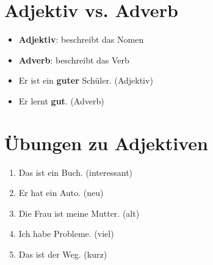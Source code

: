 \section{Adjektiv vs. Adverb}
\label{sec:AdjvsAdv}

\begin{tcolorbox}[title=Unterscheidung]
\begin{itemize}
    \item \textbf{Adjektiv}: beschreibt das Nomen
    \item \textbf{Adverb}: beschreibt das Verb
\end{itemize}
\end{tcolorbox}

\begin{itemize}
    \item Er ist ein \textbf{guter} Schüler. (Adjektiv)
    \item Er lernt \textbf{gut}. (Adverb)
\end{itemize}

\section{Übungen zu Adjektiven}
\label{sec:AdjUebungen}

\begin{enumerate}
    \item Das ist ein \underline{\hspace{1cm}} Buch. (interessant)
    \item Er hat ein \underline{\hspace{1cm}} Auto. (neu)
    \item Die \underline{\hspace{1cm}} Frau ist meine Mutter. (alt)
    \item Ich habe \underline{\hspace{1cm}} Probleme. (viel)
    \item Das ist der \underline{\hspace{1cm}} Weg. (kurz)
\end{enumerate}

\chapterend